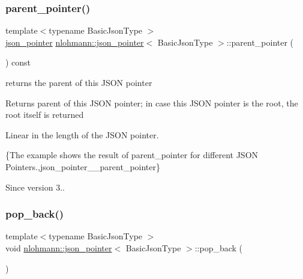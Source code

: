 \subsubsection{\texorpdfstring{parent\+\_\+pointer()}{parent\_pointer()}}
{\footnotesize\ttfamily template$<$typename Basic\+Json\+Type $>$ \\
\hyperlink{classnlohmann_1_1json__pointer}{json\+\_\+pointer} \hyperlink{classnlohmann_1_1json__pointer}{nlohmann\+::json\+\_\+pointer}$<$ Basic\+Json\+Type $>$\+::parent\+\_\+pointer (\begin{DoxyParamCaption}{ }\end{DoxyParamCaption}) const\hspace{0.3cm}{\ttfamily [inline]}}



returns the parent of this J\+S\+ON pointer 

\begin{DoxyReturn}{Returns}
parent of this J\+S\+ON pointer; in case this J\+S\+ON pointer is the root, the root itself is returned
\end{DoxyReturn}
Linear in the length of the J\+S\+ON pointer.

\{The example shows the result of {\ttfamily parent\+\_\+pointer} for different J\+S\+ON Pointers.,json\+\_\+pointer\+\_\+\+\_\+parent\+\_\+pointer\}

\begin{DoxySince}{Since}
version 3.. 
\end{DoxySince}
\mbox{\label{classnlohmann_1_1json__pointer_a4b1ee4d511ca195bed896a3da47e264c}} 
\subsubsection{\texorpdfstring{pop\+\_\+back()}{pop\_back()}}
{\footnotesize\ttfamily template$<$typename Basic\+Json\+Type $>$ \\
void \hyperlink{classnlohmann_1_1json__pointer}{nlohmann\+::json\+\_\+pointer}$<$ Basic\+Json\+Type $>$\+::pop\+\_\+back (\begin{DoxyParamCaption}{ }\end{DoxyParamCaption})\hspace{0.3cm}{\ttfamily [inline]}}



